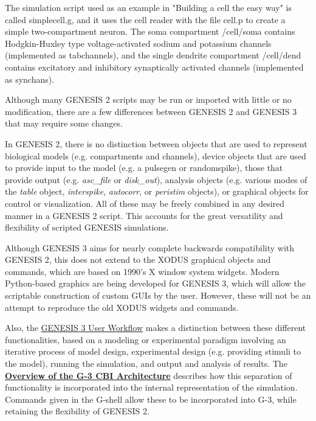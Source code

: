 \documentclass[12pt]{article}
\begin{document}
The simulation script used as an example in "Building a cell the easy
way" is called simplecell.g, and it uses the cell reader with the file
cell.p to create a simple two-compartment neuron.  The soma
compartment /cell/soma contains Hodgkin-Huxley type voltage-activated
sodium and potassium channels (implemented as tabchannels), and the single
dendrite compartment /cell/dend contains excitatory and inhibitory
synaptically activated channels (implemented as synchans).

Although many GENESIS 2 scripts may be run or imported with little or no
modification, there are a few differences between GENESIS 2 and GENESIS 3
that may require some changes.

In GENESIS 2, there is no distinction between objects that are used to
represent biological models (e.g. compartments and channels), device
objects that are used to provide input to the model (e.g. a pulsegen or
randomspike), those that provide output (e.g. {\it asc\_file} or {\it disk\_out}),
analysis objects (e.g. various modes of the {\it table} object, {\it interspike},
{\it autocorr}, or {\it peristim} objects), or graphical objects for control or
visualization.  All of these may be freely combined in any desired
manner in a GENESIS 2 script.  This accounts for the great versatility
and flexibility of scripted GENESIS simulations.

Although GENESIS 3 aims for nearly complete backwards compatibility
with GENESIS 2, this does not extend to the XODUS graphical objects and
commands, which are based on 1990's X window system widgets.  Modern
Python-based graphics are being developed for GENESIS 3, which will
allow the scriptable construction of custom GUIs by the user.
However, these will not be an attempt to reproduce the old XODUS
widgets and commands.

Also, the \href{../workflow-user/workflow-user.html}{GENESIS 3 User Workflow} makes a distinction
between these different functionalities, based on a modeling or experimental paradigm involving an
iterative process of model design, experimental design (e.g. providing stimuli to the model),
running the simulation, and output and analysis of results.  The
\href{../genesis-overview/genesis-overview.tex}{\bf Overview of the G-3 CBI Architecture}
describes how this separation of functionality is incorporated into the
internal representation of the simulation.  Commands given in the G-shell
allow these to be incorporated into G-3, while retaining the flexibility of
GENESIS 2.
\end{document}
